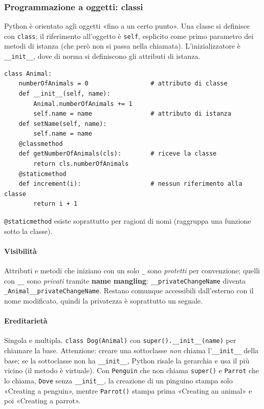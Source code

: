 \documentclass[a4paper,12pt]{article}
\begin{document}
\subsubsection{Programmazione a oggetti: classi}
Python è orientato agli oggetti «fino a un certo punto». Una classe si definisce con
\texttt{class}; il riferimento all'oggetto è \texttt{self}, esplicito come primo parametro
dei metodi di istanza (che però non si passa nella chiamata). L'inizializzatore è
\texttt{\_\_init\_\_}, dove di norma si definiscono gli attributi di istanza.
\begin{verbatim}
class Animal:
    numberOfAnimals = 0                 # attributo di classe
    def __init__(self, name):
        Animal.numberOfAnimals += 1
        self.name = name                # attributo di istanza
    def setName(self, name):
        self.name = name
    @classmethod
    def getNumberOfAnimals(cls):        # riceve la classe
        return cls.numberOfAnimals
    @staticmethod
    def increment(i):                   # nessun riferimento alla classe
        return i + 1
\end{verbatim}
\texttt{@staticmethod} esiste soprattutto per ragioni di nomi (raggruppa una funzione sotto
la classe).

\paragraph{Visibilità} Attributi e metodi che iniziano con un solo \texttt{\_} sono
\emph{protetti} per convenzione; quelli con \texttt{\_\_} sono \emph{privati} tramite
\textbf{name mangling}: \texttt{\_\_privateChangeName} diventa \texttt{\_Animal\_\_privateChangeName}.
Restano comunque accessibili dall'esterno con il nome modificato, quindi la privatezza è
soprattutto un segnale.

\paragraph{Ereditarietà} Singola e multipla. \texttt{class Dog(Animal)} con
\texttt{super().\_\_init\_\_(name)} per chiamare la base. Attenzione: creare una sottoclasse
\emph{non} chiama l'\texttt{\_\_init\_\_} della base; se la sottoclasse non ha
\texttt{\_\_init\_\_}, Python risale la gerarchia e usa il più vicino (il metodo è virtuale).
Con \texttt{Penguin} che non chiama \texttt{super()} e \texttt{Parrot} che lo chiama,
\texttt{Dove} senza \texttt{\_\_init\_\_}, la creazione di un pinguino stampa solo
«Creating a penguin», mentre \texttt{Parrot()} stampa prima «Creating an animal» e poi
«Creating a parrot».
\end{document}

